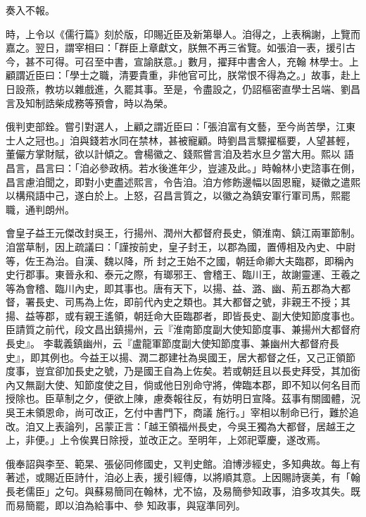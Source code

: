 \begin{pinyinscope}
 奏入不報。



 時，上令以《儒行篇》刻於版，印賜近臣及新第舉人。洎得之，上表稱謝，上覽而嘉之。翌日，謂宰相曰：「群臣上章獻文，朕無不再三省覽。如張洎一表，援引古今，甚不可得。可召至中書，宣諭朕意。」數月，擢拜中書舍人，充翰
 林學士。上顧謂近臣曰：「學士之職，清要貴重，非他官可比，朕常恨不得為之。」故事，赴上日設燕，教坊以雜戲進，久罷其事。至是，令盡設之，仍詔樞密直學士呂端、劉昌言及知制誥柴成務等預會，時以為榮。



 俄判吏部銓。嘗引對選人，上顧之謂近臣曰：「張洎富有文藝，至今尚苦學，江東士人之冠也。」洎與錢若水同在禁林，甚被寵顧。時劉昌言驟擢樞要，人望甚輕，董儼方掌財賦，欲以計傾之。會楊徽之、錢熙嘗言洎及若水旦夕當大用。熙以
 語昌言，昌言曰：「洎必參政柄。若水後進年少，豈遽及此。」時翰林小吏諮事在側，昌言慮洎聞之，即對小吏盡述熙言，令告洎。洎方修飭邊幅以固恩寵，疑徽之遣熙以構飛語中己，遂白於上。上怒，召昌言質之，以徽之為鎮安軍行軍司馬，熙罷職，通判朗州。



 會皇子益王元傑改封吳王，行揚州、潤州大都督府長史，領淮南、鎮江兩軍節制。洎當草制，因上疏議曰：「謹按前史，皇子封王，以郡為國，置傅相及內史、中尉等，佐王為治。自漢、魏以降，所
 封之王始不之國，朝廷命卿大夫臨郡，即稱內史行郡事。東晉永和、泰元之際，有瑯邪王、會稽王、臨川王，故謝靈運、王羲之等為會稽、臨川內史，即其事也。唐有天下，以揚、益、潞、幽、荊五郡為大都督，署長史、司馬為上佐，即前代內史之類也。其大都督之號，非親王不授；其揚、益等郡，或有親王遙領，朝廷命大臣臨郡者，即皆長史、副大使知節度事也。臣請質之前代，段文昌出鎮揚州，云『淮南節度副大使知節度事、兼揚州大都督府長史』。
 李載義鎮幽州，云『盧龍軍節度副大使知節度事、兼幽州大都督府長史』，即其例也。今益王以揚、潤二郡建社為吳國王，居大都督之任，又己正領節度事，豈宜卻加長史之號，乃是國王自為上佐矣。若或朝廷且以長史拜受，其加銜內又無副大使、知節度使之目，倘或他日別命守將，俾臨本郡，即不知以何名目而授除也。臣草制之夕，便欲上陳，慮奏報往反，有妨明日宣降。茲事有關國體，況吳王未領恩命，尚可改正，乞付中書門下，商議
 施行。」宰相以制命已行，難於追改。洎又上表論列，呂蒙正言：「越王領福州長史，今吳王獨為大都督，居越王之上，非便。」上令俟異日除授，並改正之。至明年，上郊祀覃慶，遂改焉。



 俄奉詔與李至、範杲、張佖同修國史，又判史館。洎博涉經史，多知典故。每上有著述，或賜近臣詩什，洎必上表，援引經傳，以將順其意。上因賜詩褒美，有「翰長老儒臣」之句。與蘇易簡同在翰林，尤不協，及易簡參知政事，洎多攻其失。既而易簡罷，即以洎為給事中、參
 知政事，與寇準同列。




\end{pinyinscope}
